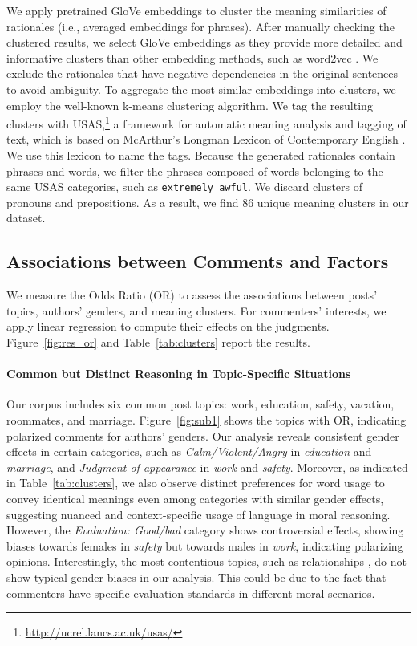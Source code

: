 \documentclass[letterpaper]{article} %
\begin{document}
We apply pretrained GloVe embeddings \cite{pennington-2014-glove} to cluster the meaning similarities of rationales (i.e., averaged embeddings for phrases). 
After manually checking the clustered results, we select GloVe embeddings as they provide more detailed and informative clusters than other embedding methods, such as word2vec \cite{mikolov-2013-distribute}. 
We exclude the rationales that have negative dependencies in the original sentences to avoid ambiguity.
To aggregate the most similar embeddings into clusters, we employ the well-known k-means clustering algorithm. 
We tag the resulting clusters with USAS,\footnote{\url{http://ucrel.lancs.ac.uk/usas/}} a framework for automatic meaning analysis and tagging of text, which is based on McArthur's Longman Lexicon of Contemporary English \cite{mcarthur-1982-longman}. 
We use this lexicon \cite{piao-2015-development} to name the tags.
Because the generated rationales contain phrases and words, we filter the phrases composed of words belonging to the same USAS categories, such as \texttt{extremely awful}. 
We discard clusters of pronouns and prepositions. 
As a result, we find 86 unique meaning clusters in our dataset.

\subsection{Associations between Comments and Factors}

We measure the Odds Ratio (OR) to assess the associations between posts' topics, authors' genders, and meaning clusters.
For commenters' interests, we apply linear regression to compute their effects on the judgments. 
Figure~\ref{fig:res_or} and Table~\ref{tab:clusters} report the results.

\paragraph{Common but Distinct Reasoning in Topic-Specific Situations}

Our corpus includes six common post topics: work, education, safety, vacation, roommates, and marriage. 
Figure~\ref{fig:sub1} shows the topics with OR, indicating polarized comments for authors' genders.
Our analysis reveals consistent gender effects in certain categories, such as \textsl{Calm/Violent/Angry} in \textsl{education} and \textsl{marriage}, and \textsl{Judgment of appearance} in \textsl{work} and \textsl{safety}.
Moreover, as indicated in Table~\ref{tab:clusters}, we also observe distinct preferences for word usage to convey identical meanings even among categories with similar gender effects, suggesting nuanced and context-specific usage of language in moral reasoning.
However, the \textsl{Evaluation: Good/bad} category shows controversial effects, showing biases towards females in \textsl{safety} but towards males in \textsl{work}, indicating polarizing opinions.
Interestingly, the most contentious topics, such as relationships \cite{candia-2022-demo, ferrer-2021-biasreddit}, do not show typical gender biases in our analysis.
This could be due to the fact that commenters have specific evaluation standards in different moral scenarios. 
\end{document}

